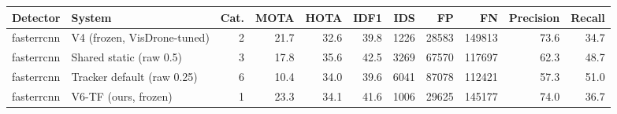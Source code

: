 \begin{tabular}{llrrrrrrrrr}
\toprule
Detector & System & Cat. & MOTA & HOTA & IDF1 & IDS & FP & FN & Precision & Recall \\
\midrule
fasterrcnn & V4 (frozen, VisDrone-tuned) & 2 & 21.7 & 32.6 & 39.8 & 1226 & 28583 & 149813 & 73.6 & 34.7 \\
fasterrcnn & Shared static (raw 0.5) & 3 & 17.8 & 35.6 & 42.5 & 3269 & 67570 & 117697 & 62.3 & 48.7 \\
fasterrcnn & Tracker default (raw 0.25) & 6 & 10.4 & 34.0 & 39.6 & 6041 & 87078 & 112421 & 57.3 & 51.0 \\
fasterrcnn & V6-TF (ours, frozen) & 1 & 23.3 & 34.1 & 41.6 & 1006 & 29625 & 145177 & 74.0 & 36.7 \\
\bottomrule
\end{tabular}
